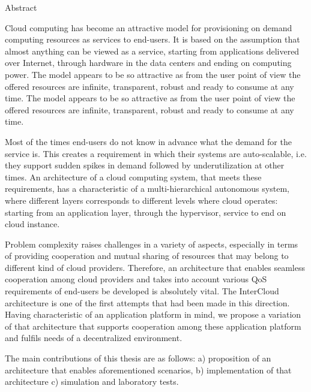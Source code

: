 \vspace*{0.5cm}

\begin{center}
  \LARGE Abstract
\end{center}

Cloud computing has become an attractive model for provisioning on demand computing resources as services to end-users. It is based on the assumption that almost anything can be viewed as a service, starting from applications delivered over Internet, through hardware in the data centers and ending on computing power. The model appears to be so attractive as from the user point of view the offered resources are infinite, transparent, robust and ready to consume at any time. The model appears to be so attractive as from the user point of view the offered resources are infinite, transparent, robust and ready to consume at any time.

Most of the times end-users do not know in advance what the demand for the service is. This creates a requirement in which their systems are auto-scalable, i.e. they support sudden spikes in demand followed by underutilization at other times. An architecture of a cloud computing system, that meets these requirements, has a characteristic of a multi-hierarchical autonomous system, where different layers corresponds to different levels where cloud operates: starting from an application layer, through the hypervisor, service to end on cloud instance.

Problem complexity raises challenges in a variety of aspects, especially in terms of providing cooperation and mutual sharing of resources that may belong to different kind of cloud providers. Therefore, an architecture that enables seamless cooperation among cloud providers and takes into account various QoS requirements of end-users be developed is absolutely vital. The InterCloud architecture is one of the first attempts that had been made in this direction. Having characteristic of an application platform in mind, we propose a variation of that architecture that supports cooperation among these application platform and fulfils needs of a decentralized environment.

The main contributions of this thesis are as follows: a) proposition of an architecture that enables aforementioned scenarios, b) implementation of that architecture c) simulation and laboratory tests.


